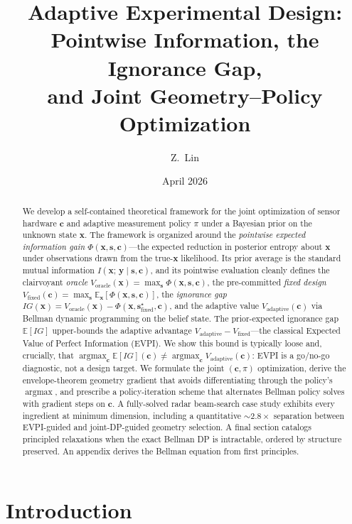 \documentclass[11pt,a4paper]{article}
\title{Adaptive Experimental Design:\\Pointwise Information, the Ignorance Gap,\\and Joint Geometry--Policy Optimization}
\author{Z.\ Lin}
\date{April 2026}
\newcommand{\E}{\mathbb{E}}
\newcommand{\argmax}{\operatorname{argmax}}
\begin{document}
\maketitle

\begin{abstract}
We develop a self-contained theoretical framework for the joint optimization of sensor hardware $\bm{c}$ and adaptive measurement policy $\pi$ under a Bayesian prior on the unknown state $\bm{x}$.  The framework is organized around the \emph{pointwise expected information gain} $\Phi(\bm{x}, \bm{s}, \bm{c})$---the expected reduction in posterior entropy about $\bm{x}$ under observations drawn from the true-$\bm{x}$ likelihood.  Its prior average is the standard mutual information $I(\bm{x};\,\bm{y}\mid\bm{s},\bm{c})$, and its pointwise evaluation cleanly defines the clairvoyant \emph{oracle} $V_{\mathrm{oracle}}(\bm{x}) = \max_{\bm{s}} \Phi(\bm{x}, \bm{s}, \bm{c})$, the pre-committed \emph{fixed design} $V_{\mathrm{fixed}}(\bm{c}) = \max_{\bm{s}} \E_{\bm{x}}[\Phi(\bm{x}, \bm{s}, \bm{c})]$, the \emph{ignorance gap} $IG(\bm{x}) = V_{\mathrm{oracle}}(\bm{x}) - \Phi(\bm{x},\bm{s}^\star_{\mathrm{fixed}},\bm{c})$, and the adaptive value $V_{\mathrm{adaptive}}(\bm{c})$ via Bellman dynamic programming on the belief state.  The prior-expected ignorance gap $\E[IG]$ upper-bounds the adaptive advantage $V_{\mathrm{adaptive}} - V_{\mathrm{fixed}}$---the classical Expected Value of Perfect Information (EVPI).  We show this bound is typically loose and, crucially, that $\argmax_{\bm{c}} \E[IG](\bm{c}) \neq \argmax_{\bm{c}} V_{\mathrm{adaptive}}(\bm{c})$: EVPI is a go/no-go diagnostic, not a design target.  We formulate the joint $(\bm{c}, \pi)$ optimization, derive the envelope-theorem geometry gradient that avoids differentiating through the policy's $\argmax$, and prescribe a policy-iteration scheme that alternates Bellman policy solves with gradient steps on $\bm{c}$.  A fully-solved radar beam-search case study exhibits every ingredient at minimum dimension, including a quantitative $\sim\!2.8\times$ separation between EVPI-guided and joint-DP-guided geometry selection.  A final section catalogs principled relaxations when the exact Bellman DP is intractable, ordered by structure preserved.  An appendix derives the Bellman equation from first principles.
\end{abstract}

\tableofcontents

\section{Introduction}
\label{sec:intro}
\end{document}
